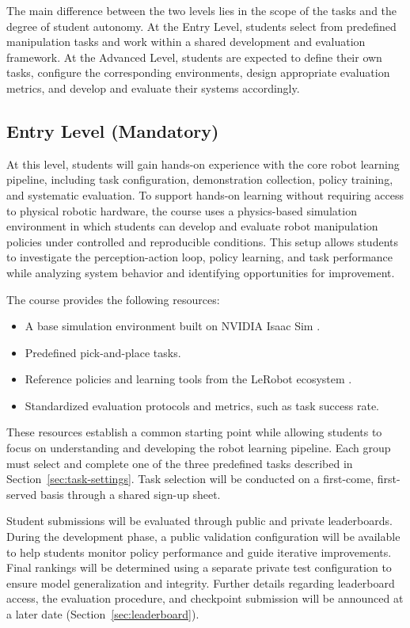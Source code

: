 \documentclass[11pt]{article}
\begin{document}
The main difference between the two levels lies in the scope of the tasks and the degree of student autonomy. At the Entry Level, students select from predefined manipulation tasks and work within a shared development and evaluation framework. At the Advanced Level, students are expected to define their own tasks, configure the corresponding environments, design appropriate evaluation metrics, and develop and evaluate their systems accordingly.


\subsection{Entry Level (Mandatory)}
At this level, students will gain hands-on experience with the core robot learning pipeline, including task configuration, demonstration collection, policy training, and systematic evaluation. To support hands-on learning without requiring access to physical robotic hardware, the course uses a physics-based simulation environment in which students can develop and evaluate robot manipulation policies under controlled and reproducible conditions. This setup allows students to investigate the perception-action loop, policy learning, and task performance while analyzing system behavior and identifying opportunities for improvement. 

The course provides the following resources:
\begin{itemize}
  \item A base simulation environment built on NVIDIA Isaac Sim \cite{isaacsim2026}.
  \item Predefined pick-and-place tasks.
  \item Reference policies and learning tools from the LeRobot ecosystem \cite{cadene2024lerobot}.
  \item Standardized evaluation protocols and metrics, such as task success rate.
\end{itemize}

These resources establish a common starting point while allowing students to focus on understanding and developing the robot learning pipeline. Each group must select and complete one of the three predefined tasks described in Section~\ref{sec:task-settings}. Task selection will be conducted on a first-come, first-served basis through a shared sign-up sheet. 

Student submissions will be evaluated through public and private leaderboards. During the development phase, a public validation configuration will be available to help students monitor policy performance and guide iterative improvements. Final rankings will be determined using a separate private test configuration to ensure model generalization and integrity. Further details regarding leaderboard access, the evaluation procedure, and checkpoint submission will be announced at a later date (Section~\ref{sec:leaderboard}).
\end{document}
